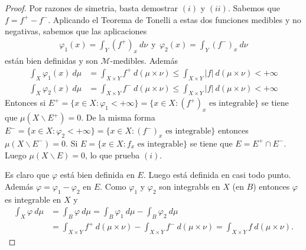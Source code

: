 \begin{proof}
    Por razones de simetria, basta demostrar $(i)$ y $(ii)$. Sabemos que $f = f^+ - f^-$. Aplicando el Teorema de Tonelli a estas dos funciones medibles y no negativas, sabemos que las aplicaciones
    \begin{align*}
        \varphi_1(x) = \int_{Y}{(f^+)_x \ d\nu} \ \ \text{y} \ \ \varphi_2(x) = \int_{Y}{(f^-)_x \ d\nu}
    \end{align*}
    están bien definidas y son $\mathcal{M}$-medibles. Además
    \begin{align*}
        \int_{X}{\varphi_1(x) \ d\mu} & = \int_{X \times Y}{f^+ \ d(\mu \times \nu)} \leq \int_{X \times Y}{|f| \ d(\mu \times \nu)} < +\infty \\
        \int_{X}{\varphi_2(x) \ d\mu} & = \int_{X \times Y}{f^- \ d(\mu \times \nu)} \leq \int_{X \times Y}{|f| \ d(\mu \times \nu)} < +\infty
    \end{align*}
    Entonces si $E^+ = \{x \in X : \varphi_1 < +\infty\} = \{ x \in X : (f^+)_x \text{ es integrable}\}$ se tiene que $\mu(X \backslash E^+) = 0$. De la misma forma $E^- = \{x \in X : \varphi_2 < +\infty\} = \{ x \in X : (f^-)_x \text{ es integrable}\}$ entonces $\mu(X \backslash E^-) = 0$. Si $E = \{x \in X : f_x \text{ es integrable}\}$ se tiene que $E = E^+  \cap E^-$. Luego $\mu(X \backslash E) = 0$, lo que prueba $(i)$.

    Es claro que $\varphi$ está bien definida en $E$. Luego está definida en casi todo punto. Además $\varphi = \varphi_1 - \varphi_2$ en $E$. Como $\varphi_1$ y $\varphi_2$ son integrabls en $X$ (en $B$) entonces $\varphi$ es integrable en $X$ y
    \begin{align*}
        \int_{X}{\varphi \ d\mu} & = \int_{B}{\varphi \ d\mu} = \int_{B}{\varphi_1 \ d\mu} - \int_{B}{\varphi_2 \ d\mu}                                                  \\
                                 & = \int_{X \times Y}{f^+ \ d(\mu \times \nu)} - \int_{X \times Y}{f^- \ d(\mu \times \nu)} = \int_{X \times Y}{f \ d(\mu \times \nu)}.
    \end{align*}
\end{proof}


